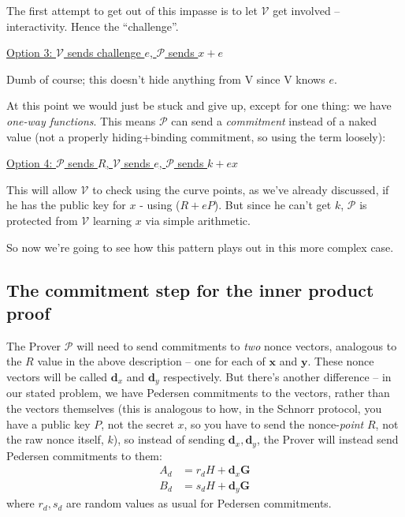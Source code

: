 \documentclass[10pt,a4paper]{article}
\begin{document}
The first attempt to get out of this impasse is to let $\mathcal{V}$ get involved --
interactivity. Hence the ``challenge''.

\underline{Option 3: $\mathcal{V}$ sends challenge $e$, $\mathcal{P}$ sends $x+e$}

Dumb of course; this doesn't hide anything from V since V knows $e$.

At this point we would just be stuck and give up, except for one thing:
we have \emph{one-way functions}. This means $\mathcal{P}$ can send a
\emph{commitment} instead of a naked value (not a properly
hiding+binding commitment, so using the term loosely):

\underline{Option 4: $\mathcal{P}$ sends $R$, $\mathcal{V}$ sends $e$, $\mathcal{P}$ sends $k+ex$}

This will allow $\mathcal{V}$ to check using the curve points, as we've already
discussed, if he has the public key for $x$ - using ($R+eP$). But since he can't
get $k$, $\mathcal{P}$ is protected from $\mathcal{V}$ learning $x$ via simple arithmetic.

So now we're going to see how this pattern plays out in this more
complex case.

\hypertarget{the-commitment-step-for-the-inner-product-proof}{%
\subsection[The commitment step for the inner product
proof]{\texorpdfstring{\protect\hypertarget{anchor-36}{}{}The commitment
step for the inner product
proof}{The commitment step for the inner product proof}}\label{the-commitment-step-for-the-inner-product-proof}}

The Prover $\mathcal{P}$ will need to send commitments to \emph{two} nonce vectors, analogous to the
$R$ value in the above description -- one for each of $\mathbf{x}$ and
$\mathbf{y}$. These nonce vectors will be called $\mathbf{d}_x$ and $\mathbf{d}_y$ respectively. 
But there's another difference -- in our stated problem, we have Pedersen commitments to the
vectors, rather than the vectors themselves (this is analogous to how,
in the Schnorr protocol, you have a public key $P$, not the secret $x$, so you
have to send the nonce-\emph{point} $R$, not the raw nonce itself, $k$), so
instead of sending $\mathbf{d}_x, \mathbf{d}_y$, the Prover will instead send Pedersen commitments
to them:
\begin{align}
A_d &= r_d H + \mathbf{d}_x\mathbf{G} \label{inner_product_proof_AB_d_def:1} \\
B_d &= s_d H + \mathbf{d}_y\mathbf{G} \label{inner_product_proof_AB_d_def:2}
\end{align}
where $r_d, s_d$ are random values as usual for Pedersen commitments.
\end{document}
